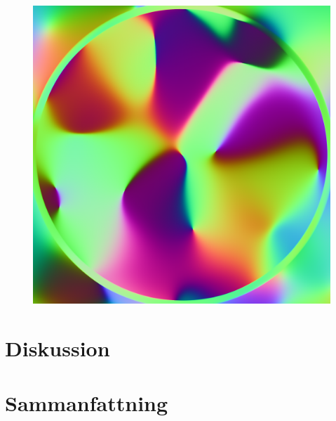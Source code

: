 \documentclass[a4paper]{article}
\begin{document}
\begin{figure}[H]
\begin{minipage}[]{0.19\textwidth}
\end{minipage}
\begin{minipage}[]{0.19\textwidth}
\includegraphics[width=\textwidth]{share/Curl.png}
\end{minipage}
\end{figure}

    \section{Diskussion}

    \section{Sammanfattning}

    \nocite{*} %
    
    
\end{document}
